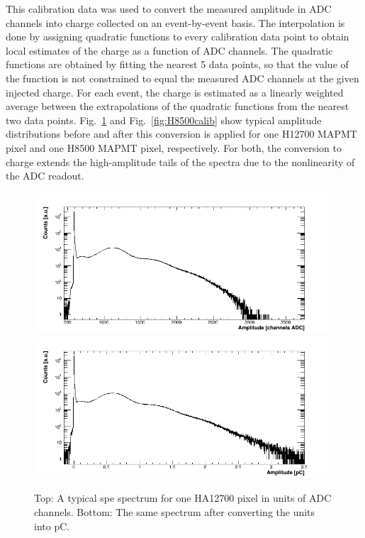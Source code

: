 This calibration data was used to convert the measured amplitude in ADC channels into charge collected on an event-by-event basis. The interpolation is done by assigning quadratic functions to every calibration data point to obtain local estimates of the charge as a function of ADC channels. The quadratic functions are obtained by fitting the nearest 5 data points, so that the value of the function is not constrained to equal the measured ADC channels at the given injected charge. For each event, the charge is estimated as a linearly weighted average between the extrapolations of the quadratic functions from the nearest two data points. Fig.~\ref{fig:H12700calib} and Fig.~\ref{fig:H8500calib} show typical amplitude distributions before and after this conversion is applied for one H12700 MAPMT pixel and one H8500 MAPMT pixel, respectively. For both, the conversion to charge extends the high-amplitude tails of the spectra due to the nonlinearity of the ADC readout.

\begin{figure}[hbt]
	\centering
	\includegraphics[width=\linewidth]{figures/GA0982_w1_g064_v1100_063_adc.png}
	\includegraphics[width=\linewidth]{figures/GA0982_w1_g064_v1100_063_pC.png}	
	\caption{Top: A typical spe spectrum for one HA12700 pixel in units of ADC channels. Bottom: The same spectrum after converting the units into pC.}
	\label{fig:H12700calib}
\end{figure}

